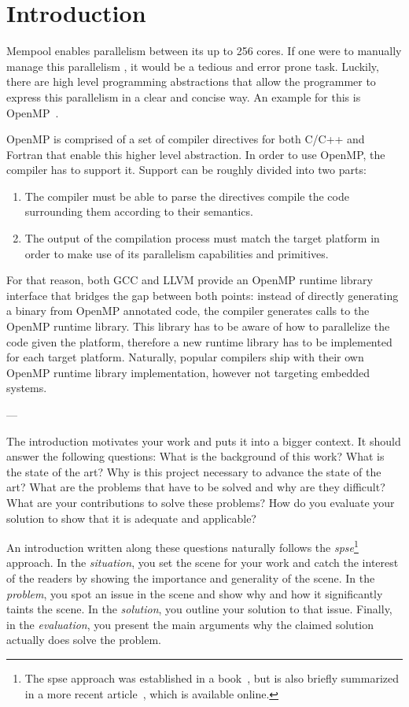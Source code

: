 \chapter{Introduction}
\label{ch:introduction}

Mempool enables parallelism between its up to 256 cores. If one were to
manually manage this parallelism , it would be a tedious and error prone task.
Luckily, there are high level programming abstractions that allow the
programmer to express this parallelism in a clear and concise way. An
example for this is OpenMP~\cite{openmp}.

OpenMP is comprised of a set of compiler directives for both C/C++ and Fortran
that enable this higher level abstraction. In order to use OpenMP, the compiler
has to support it. Support can be roughly divided into two parts:

\begin{enumerate}
	\item The compiler must be able to parse the directives compile the code surrounding them
	      according to their semantics.
	\item The output of the compilation process must match the target platform
	      in order to make use of its parallelism capabilities and primitives.
\end{enumerate}

For that reason, both GCC and LLVM provide an OpenMP runtime library interface that bridges the gap
between both points: instead of directly generating a binary from OpenMP annotated code, the compiler
generates calls to the OpenMP runtime library. This library has to be aware of how to parallelize the
code given the platform, therefore a new runtime library has to be implemented for each target platform.
Naturally, popular compilers ship with their own OpenMP runtime library implementation, however not
targeting embedded systems.

---

The introduction motivates your work and puts it into a bigger context.
It should answer the following questions:
What is the background of this work?
What is the state of the art?
Why is this project necessary to advance the state of the art?
What are the problems that have to be solved and why are they difficult?
What are your contributions to solve these problems?
How do you evaluate your solution to show that it is adequate and applicable?

An introduction written along these questions naturally follows the \textit{\gls{spse}}\footnote{%
	The \acrshort{spse} approach was established in a book~\cite{Hoey83}, but is also briefly summarized in a more recent article~\cite{MP12}, which is available online.
} approach.
In the \emph{situation}, you set the scene for your work and catch the interest of the readers by showing the importance and generality of the scene.
In the \emph{problem}, you spot an issue in the scene and show why and how it significantly taints the scene.
In the \emph{solution}, you outline your solution to that issue.
Finally, in the \emph{evaluation}, you present the main arguments why the claimed solution actually does solve the problem.

